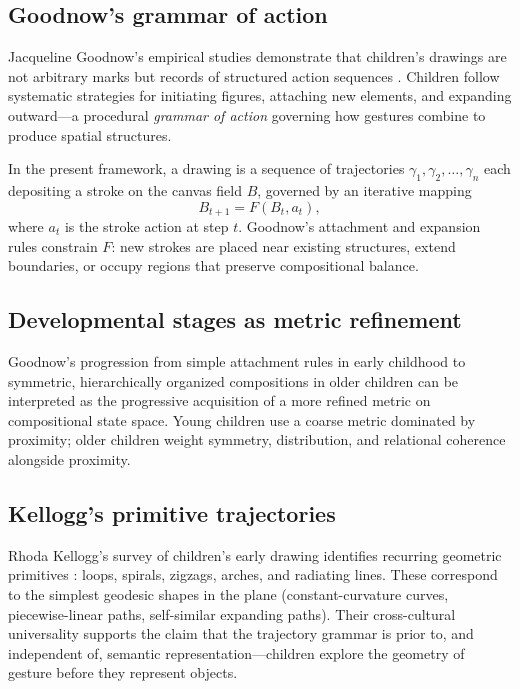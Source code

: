 \documentclass[12pt,a4paper]{article}
\theoremstyle{plain}
\theoremstyle{definition}
\begin{document}
\subsection{Goodnow's grammar of action}

Jacqueline Goodnow's empirical studies demonstrate that children's drawings
are not arbitrary marks but records of structured action sequences
\cite{goodnow1977}. Children follow systematic strategies for initiating
figures, attaching new elements, and expanding outward---a procedural
\emph{grammar of action} governing how gestures combine to produce spatial
structures.

In the present framework, a drawing is a sequence of trajectories
$\gamma_1,\gamma_2,\dots,\gamma_n$ each depositing a stroke on the canvas
field $B$, governed by an iterative mapping
\[
B_{t+1} = F(B_t, a_t),
\]
where $a_t$ is the stroke action at step $t$. Goodnow's attachment and
expansion rules constrain $F$: new strokes are placed near existing structures,
extend boundaries, or occupy regions that preserve compositional balance.

\subsection{Developmental stages as metric refinement}

Goodnow's progression from simple attachment rules in early childhood to
symmetric, hierarchically organized compositions in older children can be
interpreted as the progressive acquisition of a more refined metric on
compositional state space. Young children use a coarse metric dominated by
proximity; older children weight symmetry, distribution, and relational
coherence alongside proximity.

\subsection{Kellogg's primitive trajectories}

Rhoda Kellogg's survey of children's early drawing identifies recurring
geometric primitives \cite{kellogg1969}: loops, spirals, zigzags, arches, and
radiating lines. These correspond to the simplest geodesic shapes in the plane
(constant-curvature curves, piecewise-linear paths, self-similar expanding
paths). Their cross-cultural universality supports the claim that the trajectory
grammar is prior to, and independent of, semantic representation---children
explore the geometry of gesture before they represent objects.
\end{document}

